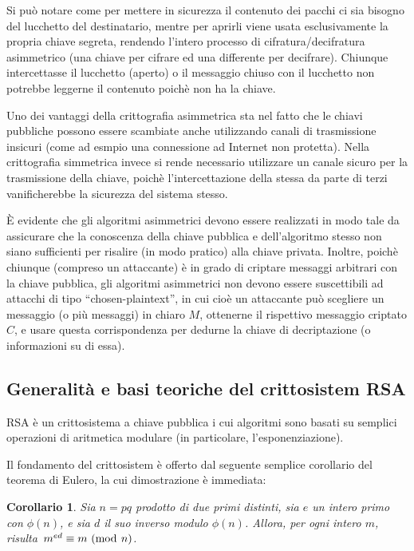 \documentclass[pdflatex,11pt,a4paper,oneside]{article}
\newcommand{\p}[1]{\left({#1}\right)}
\newcommand{\ephi}[1]{\ensuremath{\phi\p{#1}}}
\newcommand{\congruent}[0]{\equiv}
\newcommand{\mmodop}[0]{\ensuremath{\operatorname{mod}}}
\newcommand{\mmod}[1]{\ensuremath{\allowbreak\ (\mmodop\:{#1})}}
\newtheorem{corollary}[TheoremLike]{Corollario}
\begin{document}
Si pu\`o notare come per mettere in sicurezza il contenuto dei pacchi
ci sia bisogno del lucchetto del destinatario, mentre per aprirli viene
usata esclusivamente la propria chiave segreta, rendendo l'intero processo
di cifratura/decifratura asimmetrico (una chiave per cifrare ed una
differente per decifrare). Chiunque intercettasse il lucchetto (aperto)
o il messaggio chiuso con il lucchetto non potrebbe leggerne il contenuto
poich\`e non ha la chiave.

\medskip
Uno dei vantaggi della crittografia asimmetrica sta nel fatto che le
chiavi pubbliche possono essere scambiate anche utilizzando canali di
trasmissione insicuri (come ad esmpio una connessione ad Internet non
protetta). Nella crittografia simmetrica invece si rende necessario
utilizzare un canale sicuro per la trasmissione della chiave, poich\`e
l'intercettazione della stessa da parte di terzi vanificherebbe la
sicurezza del sistema stesso.

\medskip
\`E evidente che gli algoritmi asimmetrici devono essere realizzati in
modo tale da assicurare che la conoscenza della chiave pubblica e
dell'algoritmo stesso non siano sufficienti per risalire (in modo
pratico) alla chiave privata. Inoltre, poich\`e chiunque (compreso
un attaccante) \`e in grado di criptare messaggi arbitrari con la
chiave pubblica, gli algoritmi asimmetrici non devono essere
suscettibili ad attacchi di tipo ``chosen-plaintext'', in cui cio\`e
un attaccante pu\`o scegliere un messaggio (o pi\`u messaggi) in
chiaro $M$, ottenerne il rispettivo messaggio criptato $C$, e usare
questa corrispondenza per dedurne la chiave di decriptazione (o
informazioni su di essa).

\subsection{Generalit\`a e basi teoriche del crittosistem RSA}

RSA \`e un crittosistema a chiave pubblica i cui algoritmi sono basati
su semplici operazioni di aritmetica modulare (in particolare,
l'esponenziazione).

\smallskip
Il fondamento del crittosistem \`e offerto dal seguente semplice
corollario del teorema di Eulero, la cui dimostrazione \`e immediata:

\begin{corollary}\label{cor:euler-for-rsa}
Sia $n = pq$ prodotto di due primi distinti, sia $e$ un intero primo con
$\ephi{n}$, e sia $d$ il suo inverso modulo $\ephi{n}$. Allora, per ogni
intero $m$, risulta\, $m^{ed} \congruent m \mmod n$.
\end{corollary}
\end{document}

